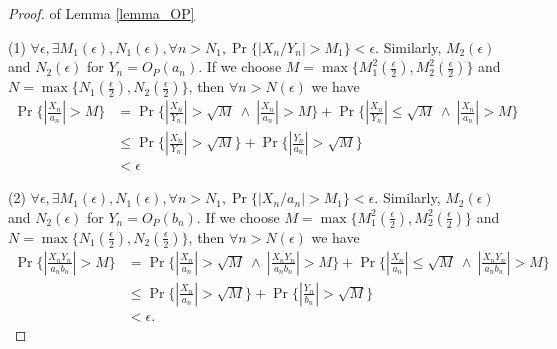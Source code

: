 \begin{proof}{ of Lemma \ref{lemma_OP}}

    (1)
    $\forall \epsilon, \exists M_1(\epsilon), N_1(\epsilon), \forall n > N_1, \Pr \{ |X_n/Y_n| > M_1 \} < \epsilon $. Similarly, $M_2(\epsilon)$ and $N_2(\epsilon)$ for $Y_n = O_P(a_n)$. If we choose $M = \max\{ M_1^2(\frac{\epsilon}{2}), M_2^2(\frac{\epsilon}{2}) \}$ and $N = \max \{ N_1(\frac{\epsilon}{2}), N_2(\frac{\epsilon}{2}) \}$, then $\forall n > N(\epsilon)$ we have 
    \begin{equation}
        \begin{split}
            \Pr \{ |\frac{X_n}{a_n}| > M \} &= \Pr\{ |\frac{X_n}{Y_n}| > \sqrt{M} \ \land \ |\frac{X_n}{a_n}| > M \} + \Pr \{ |\frac{X_n}{Y_n}| \leq \sqrt{M} \ \land \ |\frac{X_n}{a_n}| > M \} \\
            &\leq \Pr \{ |\frac{X_n}{Y_n}| > \sqrt{M} \} + \Pr \{ |\frac{Y_n}{a_n}| > \sqrt{M} \} \\
            &< \epsilon
        \end{split}
    \end{equation}

    (2)
    $\forall \epsilon, \exists M_1(\epsilon), N_1(\epsilon), \forall n>N_1, \Pr \{ |X_n/a_n| > M_1 \} < \epsilon $. Similarly, $M_2(\epsilon)$ and $N_2(\epsilon)$ for $Y_n = O_P(b_n)$. If we choose $M = \max\{ M_1^2(\frac{\epsilon}{2}), M_2^2(\frac{\epsilon}{2}) \}$ and $N = \max \{ N_1(\frac{\epsilon}{2}), N_2(\frac{\epsilon}{2}) \}$, then $\forall n>N(\epsilon)$ we have
    \begin{equation}
        \begin{split}
            \Pr \{ |\frac{X_n Y_n}{a_n b_n}| > M \} &=  
                \Pr \{ |\frac{X_n}{a_n}| > \sqrt M \ \land\ |\frac{X_n Y_n}{a_n b_n}| > M  \} + 
                \Pr \{ |\frac{X_n}{a_n}| \leq \sqrt M \ \land\ |\frac{X_n Y_n}{a_n b_n}| > M  \} \\
            &\leq  \Pr \{ |\frac{X_n}{a_n}| > \sqrt M \} + 
                \Pr \{ |\frac{Y_n}{b_n}| > \sqrt M \} \\
            &< \epsilon.
        \end{split}
    \end{equation}
\end{proof}

